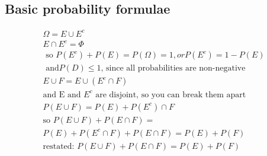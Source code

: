 \subsection{Basic probability formulae}
           \begin{gather*} 
        		\Omega = E \cup E^c \\
        		E \cap E^c = \Phi \\
      		\mbox{ so }  P(E^c) + P(E) = P(\Omega) = 1, or P(E^c) = 1-P(E) \\
        		\mbox{ and} P(D)  \leq 1 \mbox{, since all probabilities are non-negative} \\
           E \cup F = E \cup (E^c \cap F)  \\
            \mbox{and E and $E^c$ are disjoint, so you can break them apart} \\            
           P(E \cup F) = P(E) + P(E^c) \cap F \\
           \mbox{so } P(E \cup F) + P(E \cap F) =  \\ P(E) + P(E^c \cap F) + P(E \cap F) = P(E) + P(F) \\
           \mbox{restated: } P(E \cup F) + P(E \cap F) = P(E) + P(F) \\
           \end{gather*}  
    
